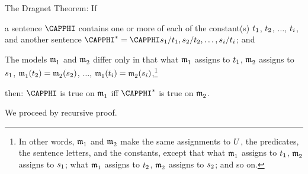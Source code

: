 \begin{THEOREM}{ The Dragnet Theorem:}
If 
\begin{cenumerate}
\item a \GQL{} sentence $\CAPPHI$ contains one or more of each of the constant(s) $t_1$, $t_2$, $\ldots$, $t_{i}$, and another \GQL{} sentence $\CAPPHI^*=\CAPPHI\variable{s}_1/\variable{t}_1,\variable{s}_2/\variable{t}_2,\ldots,\variable{s}_{\integer{i}}/\variable{t}_{\integer{i}}$; and
\item The models $\mathfrak{m^{\mathrm{}}_{\mathrm{1}}}$ and $\mathfrak{m^{\mathrm{}}_{\mathrm{2}}}$ differ only in that what $\mathfrak{m^{\mathrm{}}_{\mathrm{1}}}$ assigns to $t_1$, $\mathfrak{m^{\mathrm{}}_{\mathrm{2}}}$ assigns to $s_1$, $\mathfrak{m^{\mathrm{}}_{\mathrm{1}}}(t_2)=\mathfrak{m^{\mathrm{}}_{\mathrm{2}}}(s_2)$, $\ldots$, $\mathfrak{m^{\mathrm{}}_{\mathrm{1}}}(t_{i})=\mathfrak{m^{\mathrm{}}_{\mathrm{2}}}(s_{i})$,\footnote{In 
other words, $\mathfrak{m^{\mathrm{}}_{\mathrm{1}}}$ and $\mathfrak{m^{\mathrm{}}_{\mathrm{2}}}$ make the same assignments to $U$, the predicates, the sentence letters, and the constants, except that what $\mathfrak{m^{\mathrm{}}_{\mathrm{1}}}$ assigns to $t_1$, $\mathfrak{m^{\mathrm{}}_{\mathrm{2}}}$ assigns to $s_1$; what $\mathfrak{m^{\mathrm{}}_{\mathrm{1}}}$ assigns to $t_2$, $\mathfrak{m^{\mathrm{}}_{\mathrm{2}}}$ assigns to $s_2$; and so on.}
\end{cenumerate} 
then: $\CAPPHI$ is true on $\mathfrak{m^{\mathrm{}}_{\mathrm{1}}}$ iff $\CAPPHI^*$ is true on $\mathfrak{m^{\mathrm{}}_{\mathrm{2}}}$.

\end{THEOREM}
\noindent{}We proceed by recursive proof.
